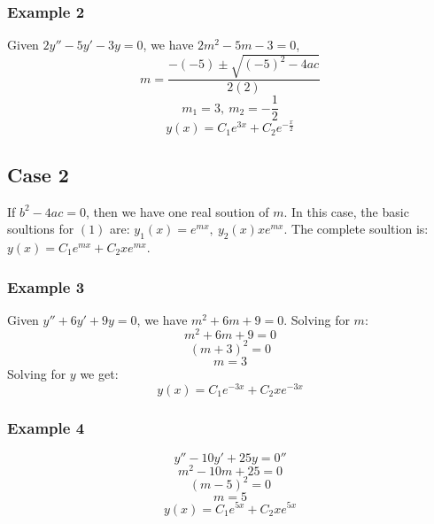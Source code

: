 \documentclass{article}
\begin{document}
\subsubsection{Example 2}
Given $2y'' - 5y' -3y = 0$, we have $2m^2 - 5m - 3 = 0$,
$$m = \frac{-(-5) \pm \sqrt{(-5)^2 - 4ac}}{2(2)}$$
$$m_1 = 3,~m_2 = -\frac{1}{2}$$
$$y(x) = C_1e^{3x} + C_2e^{-\frac{x}{2}}$$

\subsection{Case 2}
If $b^2 - 4ac = 0$, then we have one real soution of $m$.  In this case, the
basic soultions for $(1)$ are: $y_1(x) = e^{mx},~y_2(x)xe^{mx}$.  The
complete soultion is: $y(x) = C_1e^{mx} + C_2xe^{mx}$.

\subsubsection{Example 3}
Given $y'' + 6y' + 9y = 0$, we have $m^2 + 6m + 9 = 0$.  Solving for $m$:
$$m^2 + 6m + 9 = 0$$
$$(m + 3)^2 = 0$$
$$m = 3$$
Solving for $y$ we get:
$$y(x) = C_1e^{-3x} + C_2xe^{-3x}$$

\subsubsection{Example 4}
$$y'' - 10y' +25y = 0''$$
$$m^2 - 10m + 25 = 0$$
$$(m - 5)^2 = 0$$
$$m = 5$$
$$y(x) = C_1e^{5x} + C_2xe^{5x}$$
\end{document}
